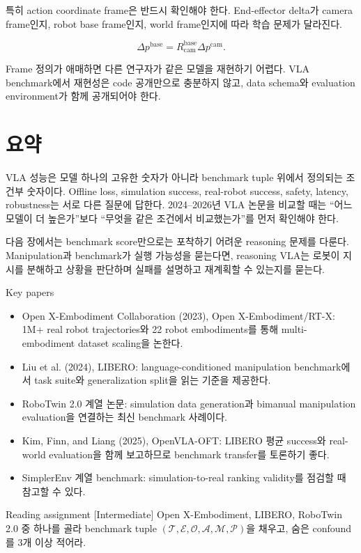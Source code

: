 특히 action coordinate frame은 반드시 확인해야 한다. End-effector delta가 camera frame인지, robot base frame인지, world frame인지에 따라 학습 문제가 달라진다.

\begin{equation}
  \Delta p^{\mathrm{base}}
  =
  R_{\mathrm{cam}}^{\mathrm{base}}
  \Delta p^{\mathrm{cam}}.
\end{equation}

Frame 정의가 애매하면 다른 연구자가 같은 모델을 재현하기 어렵다. VLA benchmark에서 재현성은 code 공개만으로 충분하지 않고, data schema와 evaluation environment가 함께 공개되어야 한다.

\section{요약}

VLA 성능은 모델 하나의 고유한 숫자가 아니라 benchmark tuple 위에서 정의되는 조건부 숫자이다. Offline loss, simulation success, real-robot success, safety, latency, robustness는 서로 다른 질문에 답한다. 2024--2026년 VLA 논문을 비교할 때는 ``어느 모델이 더 높은가''보다 ``무엇을 같은 조건에서 비교했는가''를 먼저 확인해야 한다.

다음 장에서는 benchmark score만으로는 포착하기 어려운 reasoning 문제를 다룬다. Manipulation과 benchmark가 실행 가능성을 묻는다면, reasoning VLA는 로봇이 지시를 분해하고 상황을 판단하며 실패를 설명하고 재계획할 수 있는지를 묻는다.

\begin{sourcebox}{Key papers}
\begin{itemize}
  \item Open X-Embodiment Collaboration (2023), Open X-Embodiment/RT-X: 1M+ real robot trajectories와 22 robot embodiments를 통해 multi-embodiment dataset scaling을 논한다.
  \item Liu et al. (2024), LIBERO: language-conditioned manipulation benchmark에서 task suite와 generalization split을 읽는 기준을 제공한다.
  \item RoboTwin 2.0 계열 논문: simulation data generation과 bimanual manipulation evaluation을 연결하는 최신 benchmark 사례이다.
  \item Kim, Finn, and Liang (2025), OpenVLA-OFT: LIBERO 평균 success와 real-world evaluation을 함께 보고하므로 benchmark transfer를 토론하기 좋다.
  \item SimplerEnv 계열 benchmark: simulation-to-real ranking validity를 점검할 때 참고할 수 있다.
\end{itemize}
\end{sourcebox}

\begin{assignmentbox}{Reading assignment [Intermediate]}
Open X-Embodiment, LIBERO, RoboTwin 2.0 중 하나를 골라 benchmark tuple \((\mathcal{T}, \mathcal{E}, \mathcal{O}, \mathcal{A}, \mathcal{M}, \mathcal{P})\)을 채우고, 숨은 confound를 3개 이상 적어라.
\end{assignmentbox}
